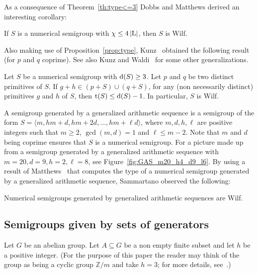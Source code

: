 As a consequence of Theorem~\ref{th:type<=3} Dobbs and Matthews derived an interesting corollary:
\begin{corollary}\label{cor:c<4l} 
	If $S$ is a numerical semigroup with $\operatorname{\chi}\le 4 \left|\operatorname{L}\right|$, then $S$ is Wilf.
\end{corollary}

Also making use of Proposition~\ref{prop:type}, Kunz~\cite{Kunz2016SF-type} obtained the following result (for $p$ and $q$ coprime). See also Kunz and Waldi~\cite{KunzWaldi2017JA-deviation} for some other generalizations.

\begin{proposition}
	Let $S$ be a numerical semigroup with $\operatorname{d}(S)\ge 3$. Let $p$ and $q$ be two distinct primitives of $S$.
	If $g+h\in (p+S)\cup(q+S)$, for any (non necessarily distinct) primitives $g$ and $h$ of $S$, then $\operatorname{t}(S)\le\operatorname{d}(S) - 1$. In particular, $S$ is Wilf.
\end{proposition}

A semigroup generated by a generalized arithmetic sequence is a semigroup of the form $S = \langle m, hm + d, hm + 2d, \ldots, hm + \ell d\rangle$, where $m, d, h, \ell$ are positive integers such that $m\ge 2$, $\gcd(m,d) = 1$ and $\ell \le m-2$. Note that $m$ and $d$ being coprime ensures that $S$ is a numerical semigroup.
For a picture made up from a semigroup generated by a generalized arithmetic sequence with $m= 20, d=9, h=2, \ell=8$, see Figure~\ref{fig:GAS_m20_h4_d9_l6}.
By using a result of Matthews~\cite[Cor.~3.4]{Matthews2005I-integers} that computes the type of a numerical semigroup generated by a generalized arithmetic sequence, Sammartano observed the following:
\begin{proposition}\label{wilf-particular:generalized-arithmetic}
	Numerical semigroups generated by generalized arithmetic sequences are Wilf.
\end{proposition}

\subsection{Semigroups given by sets of generators}\label{sec:sgps-given-sets-generators}

Let $G$ be an abelian group. Let $A\subseteq G$ be a non empty finite subset and let $h$ be a positive integer. (For the purpose of this paper the reader may think of the group as being a cyclic group $\mathbb{Z}/m$ and take $h=3$; for more details, see~\cite[Chap.~4]{TaoVu2006Book-Additive}.)


